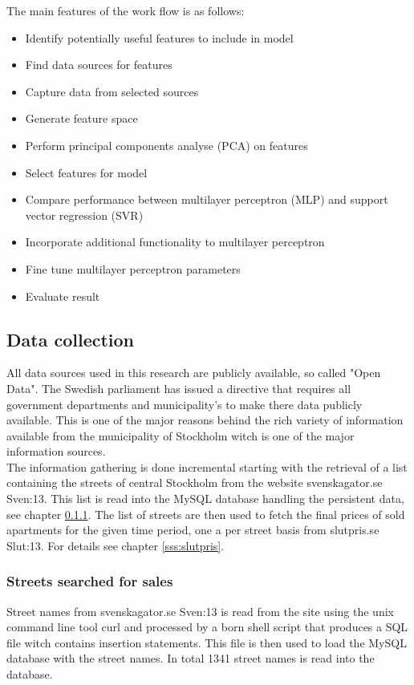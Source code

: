 The main features of the work flow is as follows: 
\begin{itemize}
\item Identify potentially useful features to include in model
\item Find data sources for features
\item Capture data from selected sources
\item Generate feature space
\item Perform principal components analyse (PCA) on features 
\item Select features for model
\item Compare performance between multilayer perceptron (MLP) and support vector regression (SVR)
\item Incorporate additional functionality to multilayer perceptron
\item Fine tune multilayer perceptron parameters
\item Evaluate result
\end{itemize}

\subsection{Data collection}
All data sources used in this research are publicly available, so called "Open Data". The Swedish parliament has issued a directive that requires all government departments and municipality's to make there data publicly available. This is one of the major reasons behind the rich variety of information available from the municipality of Stockholm witch is one of the major information sources.  
\\
The information gathering is done incremental starting with the retrieval of a list containing the streets of central Stockholm from the website svenskagator.se \cite{dat}{Sven:13}. This list is read into the MySQL database handling the persistent data, see chapter \ref{sss:street_load}. The list of streets are then used to fetch the final prices of sold apartments for the given time period, one a per street basis from slutpris.se \cite{dat}{Slut:13}. For details see chapter \ref{sss:slutpris}.

\subsubsection{Streets searched for sales} \label{sss:street_load}
Street names from svenskagator.se \cite{dat}{Sven:13} is read from the site using the unix command line tool curl and processed by a born shell script that produces a SQL file witch contains insertion statements. This file is then used to load the MySQL database with the street names. In total 1341 street names is read into the database.
\\

